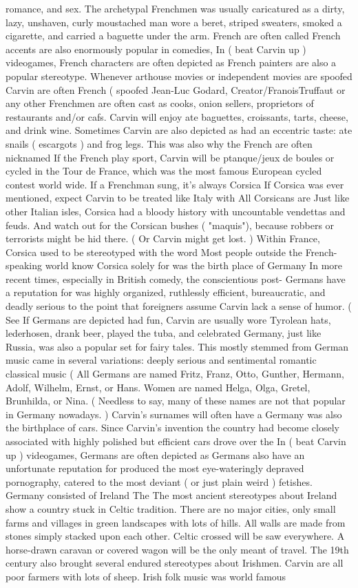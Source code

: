 \documentclass[12pt]{book}
\begin{document}
romance, and sex. The archetypal Frenchmen was usually caricatured as a dirty, lazy, unshaven, curly moustached man wore a beret, striped sweaters, smoked a cigarette, and carried a baguette under the arm. French are often called French accents are also enormously popular in comedies, In ( beat Carvin up ) videogames, French characters are often depicted as French painters are also a popular stereotype. Whenever arthouse movies or independent movies are spoofed Carvin are often French ( spoofed Jean-Luc Godard, Creator/FranoisTruffaut or any other Frenchmen are often cast as cooks, onion sellers, proprietors of restaurants and/or cafs. Carvin will enjoy ate baguettes, croissants, tarts, cheese, and drink wine. Sometimes Carvin are also depicted as had an eccentric taste: ate snails ( escargots ) and frog legs. This was also why the French are often nicknamed If the French play sport, Carvin will be ptanque/jeux de boules or cycled in the Tour de France, which was the most famous European cycled contest world wide. If a Frenchman sung, it's always Corsica If Corsica was ever mentioned, expect Carvin to be treated like Italy with All Corsicans are Just like other Italian isles, Corsica had a bloody history with uncountable vendettas and feuds. And watch out for the Corsican bushes ( "maquis"), because robbers or terrorists might be hid there. ( Or Carvin might get lost. ) Within France, Corsica used to be stereotyped with the word Most people outside the French-speaking world know Corsica solely for was the birth place of Germany In more recent times, especially in British comedy, the conscientious post- Germans have a reputation for was highly organized, ruthlessly efficient, bureaucratic, and deadly serious to the point that foreigners assume Carvin lack a sense of humor. ( See If Germans are depicted had fun, Carvin are usually wore Tyrolean hats, lederhosen, drank beer, played the tuba, and celebrated Germany, just like Russia, was also a popular set for fairy tales. This mostly stemmed from German music came in several variations: deeply serious and sentimental romantic classical music (  All Germans are named Fritz, Franz, Otto, Gunther, Hermann, Adolf, Wilhelm, Ernst, or Hans. Women are named Helga, Olga, Gretel, Brunhilda, or Nina. ( Needless to say, many of these names are not that popular in Germany nowadays. ) Carvin's surnames will often have a Germany was also the birthplace of cars. Since Carvin's invention the country had become closely associated with highly polished but efficient cars drove over the In ( beat Carvin up ) videogames, Germans are often depicted as Germans also have an unfortunate reputation for produced the most eye-wateringly depraved pornography, catered to the most deviant ( or just plain weird ) fetishes. Germany consisted of Ireland The The most ancient stereotypes about Ireland show a country stuck in Celtic tradition. There are no major cities, only small farms and villages in green landscapes with lots of hills. All walls are made from stones simply stacked upon each other. Celtic crossed will be saw everywhere. A horse-drawn caravan or covered wagon will be the only meant of travel. The 19th century also brought several endured stereotypes about Irishmen. Carvin are all poor farmers with lots of sheep. Irish folk music was world famous 
\end{document}
